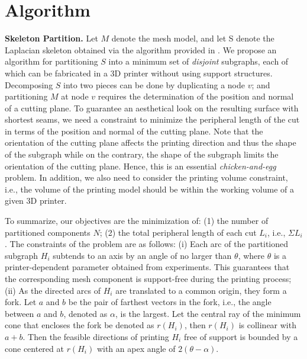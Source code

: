 \section{Algorithm}
\textbf{Skeleton Partition.} Let $M$ denote the mesh model, and let S denote the Laplacian skeleton obtained via the algorithm provided in \cite{AuTCCL08}. We propose an algorithm for partitioning $S$ into a minimum set of \emph{disjoint} subgraphs, each of which can be fabricated in a 3D printer without using support structures. Decomposing $S$ into two pieces can be done by duplicating a node $v$; and partitioning $M$ at node $v$ requires the determination of the position and normal of a cutting plane. To guarantee an aesthetical look on the resulting surface with shortest seams, we need a constraint to minimize the peripheral length of the cut in terms of the position and normal of the cutting plane. Note that the orientation of the cutting plane affects the printing direction and thus the shape of the subgraph while on the contrary, the shape of the subgraph limits the orientation of the cutting plane. Hence, this is an essential \emph{chicken-and-egg} problem. In addition, we also need to consider the printing volume constraint, i.e., the volume of the printing model should be within the working volume of a given 3{D} printer.

To summarize, our objectives are the minimization of: (1) the number of partitioned components $N$; (2) the total peripheral length of each cut $L_i$, i.e., $\Sigma L_i$. The constraints of the problem are as follows:
(i) Each arc of the partitioned subgraph $H_i$ subtends to an axis by an angle of no larger than $\theta$, where $\theta$ is a printer-dependent parameter obtained from experiments. This guarantees that the corresponding mesh component is support-free during the printing process;
(ii) As the directed arcs of $H_i$ are translated to a common origin, they form a fork. Let $a$ and $b$ be the pair of farthest vectors in the fork, i.e., the angle between $a$ and $b$, denoted as $\alpha$, is the largest. Let the central ray of the minimum cone that encloses the fork be denoted as $r(H_i)$, then $r(H_i)$ is collinear with $a + b$. Then the feasible directions of printing $H_i$ free of support is bounded by a cone centered at $r(H_i)$ with an apex angle of $2(\theta - \alpha)$. 




